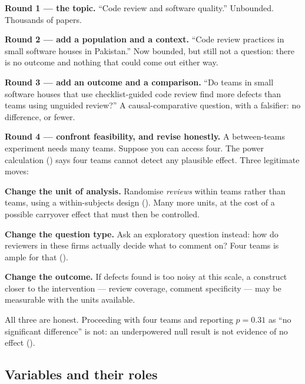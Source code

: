 \begin{worked}
\textbf{Round 1 --- the topic.} ``Code review and software quality.''
Unbounded. Thousands of papers.

\medskip
\textbf{Round 2 --- add a population and a context.} ``Code review practices in
small software houses in Pakistan.'' Now bounded, but still not a question:
there is no outcome and nothing that could come out either way.

\medskip
\textbf{Round 3 --- add an outcome and a comparison.} ``Do teams in small
software houses that use checklist-guided code review find more defects than
teams using unguided review?'' A causal-comparative question, with a
falsifier: no difference, or fewer.

\medskip
\textbf{Round 4 --- confront feasibility, and revise honestly.} A between-teams
experiment needs many teams. Suppose you can access four. The power
calculation () says four teams cannot detect any plausible
effect. Three legitimate moves:

\begin{tight}
  \item \textbf{Change the unit of analysis.} Randomise \emph{reviews} within
    teams rather than teams, using a within-subjects design
    (). Many more units, at the cost of a possible carryover
    effect that must then be controlled.
  \item \textbf{Change the question type.} Ask an exploratory question instead:
    how do reviewers in these firms actually decide what to comment on? Four
    teams is ample for that ().
  \item \textbf{Change the outcome.} If defects found is too noisy at this
    scale, a construct closer to the intervention --- review coverage,
    comment specificity --- may be measurable with the units available.
\end{tight}

\medskip
All three are honest. Proceeding with four teams and reporting $p = 0.31$ as
``no significant difference'' is not: an underpowered null result is not
evidence of no effect ().
\end{worked}

\subsection{Variables and their roles}

